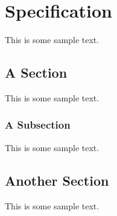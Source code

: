\chapter{Specification}

This is some sample text.

\section{A Section}

This is some sample text.

\subsection{A Subsection}

This is some sample text.

\section{Another Section}

This is some sample text.
